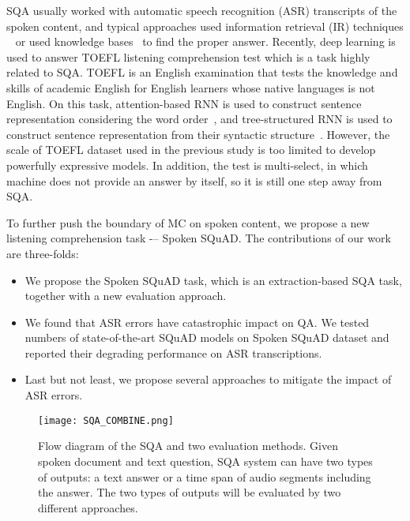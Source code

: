 \documentclass[a4paper]{article}
\begin{document}
SQA usually worked with automatic speech recognition (ASR) transcripts of the spoken content, and typical approaches used information retrieval (IR) techniques ~\cite{shiang2014spoken} or used knowledge bases~\cite{hixon2015learning} to find the proper answer. Recently, deep learning is used to answer TOEFL listening comprehension test which is a task highly related to SQA.
TOEFL is an English examination that tests the knowledge and skills of academic English for English learners whose native languages is not English. 
On this task,  attention-based RNN is used to construct sentence representation considering the word order~\cite{tseng2016towards}, and tree-structured RNN is used to construct sentence representation  from their syntactic structure~\cite{fang2016hierarchical}.
However, the scale of TOEFL dataset used in the previous study is too limited to develop powerfully expressive models. 
In addition, the test is multi-select, in which machine does not provide an answer by itself, so it is still one step away from SQA.

To further push the boundary of MC on  spoken content,  we propose a new listening comprehension task -– Spoken SQuAD.
The contributions of our work are three-folds:
\begin{itemize}
\item We propose the Spoken SQuAD task, which is an extraction-based SQA task, together with a new evaluation approach. \item We found that ASR errors have catastrophic impact on QA.  We tested numbers of state-of-the-art SQuAD models on Spoken SQuAD dataset and reported their degrading performance on ASR transcriptions. 
\item Last but not least, we propose several approaches to mitigate the impact of ASR errors. 
\end{itemize}




\begin{figure}[t]
  \centering
  \texttt{[image: SQA\_COMBINE.png]}
  \caption{Flow diagram of the SQA and two evaluation methods. 
  Given spoken document and text question, SQA system can have two types  of outputs: a text answer or a time span of audio segments including the answer.
The two types  of outputs will be evaluated by two different approaches.}
  \label{fig:sqa_task}
\end{figure}
\end{document}
